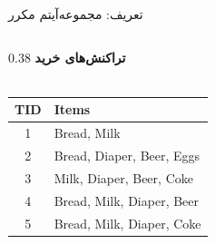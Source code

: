 \begin{frame}{تعریف: مجموعه‌آیتم مکرر}{}
\begin{columns}[T,onlytextwidth]
\begin{column}{0.38\textwidth}
\centering
\textbf{\small تراکنش‌های خرید}\\[1pt]
{\scriptsize{}}\\[3pt]
\begin{latin}
\fontsize{7.5}{9.5}\selectfont
\begin{tabular}{|c|l|}
\hline
\rowcolor{mannheimblue!15}
\textbf{TID} & \textbf{Items} \\ \hline
1 & Bread, Milk \\ \hline
2 & Bread, Diaper, Beer, Eggs \\ \hline
3 & Milk, Diaper, Beer, Coke \\ \hline
4 & Bread, Milk, Diaper, Beer \\ \hline
5 & Bread, Milk, Diaper, Coke \\ \hline
\end{tabular}
\end{latin}
\end{column}
\end{columns}
\end{frame}

